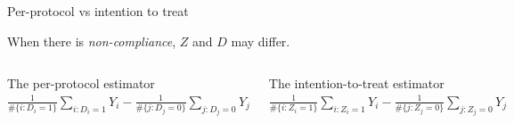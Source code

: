 \begin{frame}{Per-protocol vs intention to treat}

When there is \textit{non-compliance}, $Z$ and $D$ may differ.  \pause  

  \begin{columns}
    \begin{Column}
  { The per-protocol estimator} \\      
$\frac{1}{\# \{i: D_i = 1\}} \sum_{i:D_i=1} Y_i - \frac{1}{\# \{j: D_j = 0\}} \sum_{j:D_j=0} Y_j$
\bigskip

\vspace{.5\textheight} 
\mbox{ }

    \end{Column}
    \begin{Column}
  { The intention-to-treat estimator} \\      
$\frac{1}{\# \{i: Z_i = 1\}} \sum_{i:Z_i=1} Y_i - \frac{1}{\# \{j: Z_j = 0\}} \sum_{j:Z_j=0} Y_j$
\bigskip


\vspace{.5\textheight} 
\mbox{ }
    \end{Column}

  \end{columns}
\end{frame}

